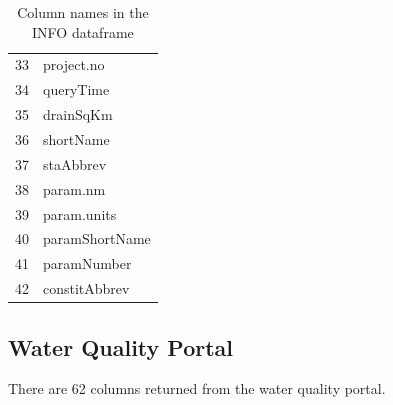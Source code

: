 \documentclass[a4paper,11pt]{article}\usepackage[]{graphicx}\usepackage[]{color}
\begin{document}
\begin{table}[ht]
\begin{tabular}{rl}
  33 & project.no \\ 
  34 & queryTime \\ 
  35 & drainSqKm \\ 
  36 & shortName \\ 
  37 & staAbbrev \\ 
  38 & param.nm \\ 
  39 & param.units \\ 
  40 & paramShortName \\ 
  41 & paramNumber \\ 
  42 & constitAbbrev \\ 
   \hline
\end{tabular}
\caption{Column names in the INFO dataframe} 
\end{table}



\FloatBarrier

\subsection{Water Quality Portal}
\label{sec:appendix2WQP}

There are 62 columns returned from the water quality portal. 
\end{document}
